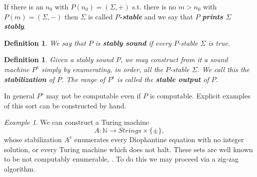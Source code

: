 \documentclass{amsart}  %
\numberwithin{equation}{section}
\newtheorem{definition}[equation]{Definition}
\theoremstyle{definition}
\theoremstyle{remark}
\newtheorem{example}[equation]{Example}
\begin{document}
{If there is an $n  _{0} $  with $P (n _{0} ) = (\Sigma  ,+ )$ s.t. there is no $m>n _{0} $ with $P (m) = (\Sigma, -)$ then $\Sigma $ is called \textbf{\emph{$P$-stable}}  and we say that $P$ \textbf{\emph{prints $\Sigma$ stably}}. 
\begin{definition}
 We say that $P$ is \textbf{\emph{stably sound}}  if every  $P$-stable $\Sigma$ is true.
  \end{definition}
\begin{definition}
   Given a stably sound $P$, we may construct from it a sound machine $P ^{s} $ simply by enumerating, in order, all the $P$-stable $\Sigma$. We call this the \textbf{\emph{stabilization}} of $P$. The range of $P ^{s} $ is called the \textbf{\emph{stable output}} of $P$.
\end{definition}
In general $P ^{s} $ may not be computable even if $P$ is computable. 
Explicit examples of this sort can be constructed by hand.
\begin{example} \label{remark:dio} We can construct a Turing machine $$A: \mathbb{N} \to Strings \times \{\pm\},$$ whose stabilization $A ^{s} $ enumerates every Diophantine equation with no integer solution, or every Turing machine which does not halt. These sets are well known to be not computably enumerable, \cite{TuringComputableNumbers}. To do this we may proceed via a zig-zag algorithm. 


\end{example}}
\end{document}
